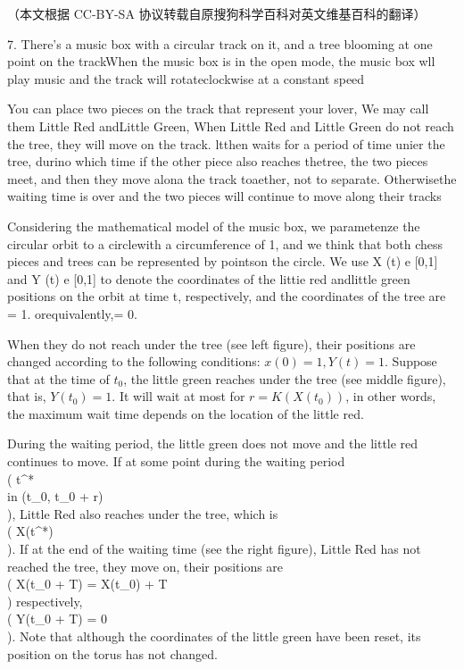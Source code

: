 
（本文根据 CC-BY-SA 协议转载自原搜狗科学百科对英文维基百科的翻译）


7. There's a music box with a circular track on it, and a tree blooming at one point on the trackWhen the music box is in the open mode, the music box wll play music and the track will rotateclockwise at a constant speed

You can place two pieces on the track that represent your lover, We may call them Little Red andLittle Green, When Little Red and Little Green do not reach the tree, they will move on the track. ltthen waits for a period of time unier the tree, durino which time if the other piece also reaches thetree, the two pieces meet, and then they move alona the track toaether, not to separate. Otherwisethe waiting time is over and the two pieces will continue to move along their tracks

Considering the mathematical model of the music box, we parametenze the circular orbit to a circlewith a circumference of 1, and we think that both chess pieces and trees can be represented by pointson the circle. We use X (t) e [0,1] and Y (t) e [0,1] to denote the coordinates of the littie red andlittle green positions on the orbit at time t, respectively, and the coordinates of the tree are = 1. orequivalently,= 0.

When they do not reach under the tree (see left figure), their positions are changed according to the following conditions:  $x(0) = 1, Y(t) = 1 $. Suppose that at the time of $ t_0 $, the little green reaches under the tree (see middle figure), that is, $Y(t_0) = 1 $. It will wait at most for $r = K(X(t_0)) $, in other words, the maximum wait time depends on the location of the little red.

During the waiting period, the little green does not move and the little red continues to move. If at some point during the waiting period \\( t^* \\in (t_0, t_0 + r) \\), Little Red also reaches under the tree, which is \\( X(t^*) \\). If at the end of the waiting time (see the right figure), Little Red has not reached the tree, they move on, their positions are \\( X(t_0 + T) = X(t_0) + T \\) respectively, \\( Y(t_0 + T) = 0 \\). Note that although the coordinates of the little green have been reset, its position on the torus has not changed.

